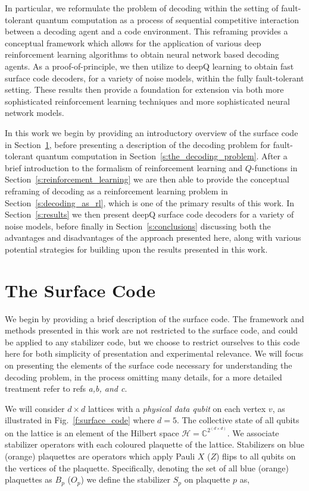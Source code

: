 \documentclass[twocolumn,preprintnumbers,amsmath,amssymb,notitlepage,nofootinbib,longbibliography,superscriptaddress,aps,pra,10pt]{revtex4-1}
\begin{document}
	In particular, we reformulate the problem of decoding within the setting of fault-tolerant quantum computation as a process of sequential competitive interaction between a decoding agent and a code environment.
	This reframing provides a conceptual framework which allows for the application of various deep reinforcement learning algorithms to obtain neural network based decoding agents.
	As a proof-of-principle, we then utilize to deepQ learning to obtain fast surface code decoders, for a variety of noise models, within the fully fault-tolerant setting.
	These results then provide a foundation for extension via both more sophisticated reinforcement learning techniques and more sophisticated neural network models.

	In this work we begin by providing an introductory overview of the surface code in Section~\ref{s:the_surface_code}, before presenting a description of the decoding problem for fault-tolerant quantum computation in Section~\ref{s:the_decoding_problem}.
	After a brief introduction to the formalism of reinforcement learning and $Q$-functions in Section~\ref{s:reinforcement_learning} we are then able to provide the conceptual reframing of decoding as a reinforcement learning problem in Section~\ref{s:decoding_as_rl}, which is one of the primary results of this work.
	In Section~\ref{s:results} we then present deepQ surface code decoders for a variety of noise models, before finally in Section~\ref{s:conclusions} discussing both the advantages and disadvantages of the approach presented here, along with various potential strategies for building upon the results presented in this work.

\section{The Surface Code}\label{s:the_surface_code}

	We begin by providing a brief description of the surface code.
	The framework and methods presented in this work are not restricted to the surface code, and could be applied to any stabilizer code, but we choose to restrict ourselves to this code here for both simplicity of presentation and experimental relevance.
	We will focus on presenting the elements of the surface code necessary for understanding the decoding problem, in the process omitting many details, for a more detailed treatment refer to refs \textit{a,b, and c}.

	We will consider $d\times d$ lattices with a \textit{physical data qubit} on each vertex $v$, as illustrated in Fig.~\ref{f:surface_code} where $d=5$.
	The collective state of all qubits on the lattice is an element of the Hilbert space $\mathcal{H} = \mathbb{C}^{2^{(d\times d)}}$.
	We associate stabilizer operators with each coloured plaquette of the lattice.
	Stabilizers on blue (orange) plaquettes are operators which apply Pauli $X$ ($Z$) flips to all qubits on the vertices of the plaquette.
	Specifically, denoting the set of all blue (orange) plaquettes as $B_p$ ($O_p$) we define the stabilizer $S_p$ on plaquette $p$ as,
\end{document}
